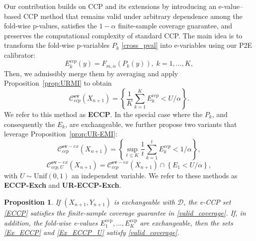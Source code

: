 \documentclass{article}
\theoremstyle{plain}
\newtheorem{proposition}[theorem]{Proposition}
\theoremstyle{definition}
\theoremstyle{remark}
\begin{document}
Our contribution builds on CCP and its extensions by introducing an e-value–based CCP method that remains valid under arbitrary dependence among the fold-wise p-values, satisfies the $1-\alpha$ finite-sample coverage guarantee, and preserves the computational complexity of standard CCP. The main idea is to transform the fold-wise p-variables $P_k$ \eqref{cross_pval} into e-variables using our P2E calibrator:
\begin{equation}
\label{eval_CCP}
    E_k^{ccp}(y) = F_{m,\alpha}(P_k(y)),\; k=1,\dots,K,
\end{equation}
Then, we admissibly merge them by averaging and apply Proposition~\ref{prop:URMI} to obtain
\begin{equation}
\label{ECCP}
    \mathcal{C}_{ccp}^{\textbf{ev}}(X_{n+1}) = \left\{ \frac{1}{K}\sum_{k=1}^K E_k^{ccp}<U/{\alpha}\right\}.
\end{equation}
We refer to this method as \textbf{ECCP}. In the special case where the \(P_k\), and consequently the \(E_k\), are exchangeable, we further propose two variants that leverage Proposition~\ref{prop:UR-EMI}:
\begin{equation}
\label{Ex_ECCP}
   \mathcal{C}_{ccp}^{\textbf{ev}-ex}(X_{n+1}) = \left\{ \sup_{t\le K}\frac{1}{t}\sum_{k=1}^t E_k^{ccp}<{1}/{\alpha}\right\},
\end{equation}
\begin{equation}
\label{Ex_ECCP_U}
   \mathcal{C}_{ccp,U}^{\textbf{ev}-ex}(X_{n+1})=\mathcal{C}_{ccp}^{\textbf{ev}-ex}(X_{n+1})\cap \left\{ E_1<{U}/{\alpha}\right\},
\end{equation}
with $U\sim \text{Unif}(0,1)$ an independent variable. We refer to these methods as \textbf{ECCP-Exch} and \textbf{UR-ECCP-Exch}. 

\begin{proposition}
\label{prop:ECCP}If $(X_{n+1},Y_{n+1})$ is exchangeable with $\mathcal{D}$,
     the e-CCP set \eqref{ECCP} satisfies the  finite-sample coverage guarantee in \eqref{valid_coverage}.  If, in addition, the fold-wise e-values
\(E^{\mathrm{ccp}}_1,\ldots,E^{\mathrm{ccp}}_K\) are exchangeable, then the sets \eqref{Ex_ECCP} and \eqref{Ex_ECCP_U} satisfy \eqref{valid_coverage}.
\end{proposition}
\end{document}
